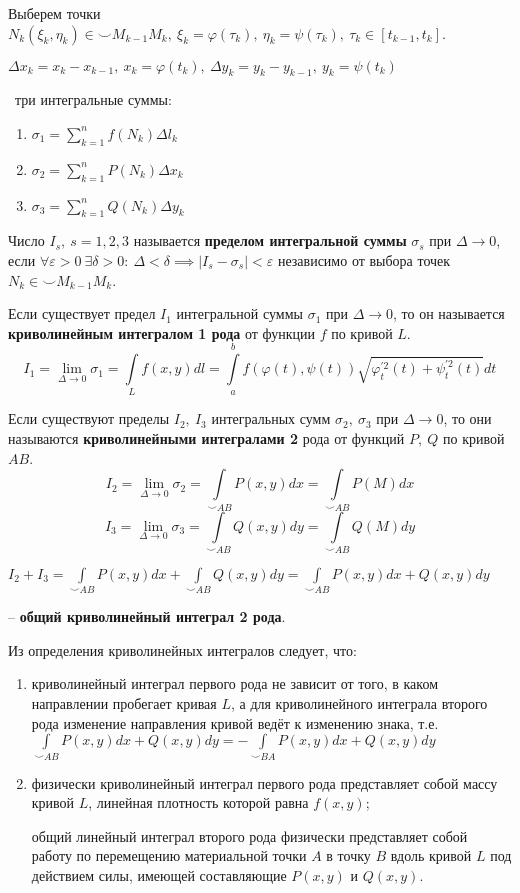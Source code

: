 Выберем точки $N_k(\xi_k, \eta_k) \in \smile M_{k-1}M_k,~\xi_k=\varphi(\tau_k),~\eta_k=\psi(\tau_k),~\tau_k\in [t_{k-1},t_k]$.

$\Delta x_k = x_k - x_{k-1},~x_k = \varphi(t_k),~\Delta y_k = y_k - y_{k-1},~y_k = \psi(t_k)$

\faEye \ три интегральные суммы:
\begin{enumerate}
    \item $\sigma_1=\displaystyle\sum_{k=1}^n f(N_k)\Delta l_k$
    \item $\sigma_2=\displaystyle\sum_{k=1}^n P(N_k)\Delta x_k$
    \item $\sigma_3=\displaystyle\sum_{k=1}^n Q(N_k)\Delta y_k$
\end{enumerate}

Число $I_s,~s=1,2,3$ называется \textbf{пределом интегральной суммы} $\sigma_s$ при $\Delta \rightarrow 0$, если $\forall\varepsilon>0~\exists\delta>0:~\Delta<\delta\implies|I_s-\sigma_s|<\varepsilon$ независимо от выбора точек $N_k\in\smile M_{k-1}M_k$.

Если существует предел $I_1$ интегральной суммы $\sigma_1$ при $\Delta \rightarrow 0$, то он называется \textbf{криволинейным интегралом 1 рода} от функции $f$ по кривой $L$.
$$I_1=\displaystyle\lim_{\Delta\to 0}\sigma_1
= \int\limits_{L}f(x,y)dl 
=\int\limits_{a}^{b} f(\varphi(t), \psi(t)) \sqrt{ \varphi_t^{'2}(t) + \psi_t^{'2}(t) } dt $$

Если существуют пределы $I_2,~I_3$ интегральных сумм $\sigma_2,~\sigma_3$ при $\Delta \rightarrow 0$, то они называются \textbf{криволинейными интегралами 2} рода от функций $P,~Q$ по кривой $AB$.
$$I_2=\displaystyle\lim_{\Delta\to 0}\sigma_2= \int\limits_{\smile AB}P(x,y)dx =\int\limits_{\smile AB}P(M)dx $$
$$I_3=\displaystyle\lim_{\Delta\to 0}\sigma_3= \int\limits_{\smile AB}Q(x,y)dy =\int\limits_{\smile AB}Q(M)dy $$

$I_2+I_3=\int\limits_{\smile AB}P(x,y)dx+\int\limits_{\smile AB}Q(x,y)dy = \int\limits_{\smile AB}P(x,y)dx+Q(x,y)dy$ 

-- \textbf{общий криволинейный интеграл 2 рода}.

Из определения криволинейных интегралов следует, что:
\begin{enumerate}
    \item криволинейный интеграл первого рода не зависит от того, в каком направлении пробегает кривая $L$, а для криволинейного интеграла второго рода изменение направления кривой ведёт к изменению знака, т.е. $\int\limits_{\smile AB}P(x,y)dx+Q(x,y)dy=-\int\limits_{\smile BA}P(x,y)dx+Q(x,y)dy$
    \item физически криволинейный интеграл первого рода представляет собой массу кривой $L$, линейная плотность которой равна $f(x, y)$;

    общий линейный интеграл второго рода физически представляет собой работу по перемещению материальной точки $A$ в точку $B$ вдоль кривой $L$ под действием силы, имеющей составляющие $P(x, y)$ и $Q(x, y)$.

\end{enumerate}

